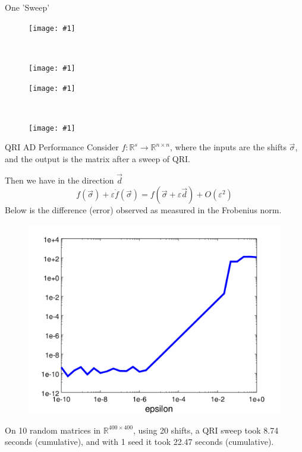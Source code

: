 \documentclass[12pt]{beamer}
\renewcommand{\d}[1]{\dot{#1}}
\newcommand{\e}{\varepsilon}
\newcommand{\pic}[1]{\texttt{[image: \#1]}}
\begin{document}
  \begin{frame}{One 'Sweep'}
    \vspace*{-.8cm}
    \begin{figure}[h!]
      \centering
      \begin{minipage}[t]{.5\linewidth}
        \centering
        \pic{simpSweep1}
      \end{minipage}~
      \begin{minipage}[t]{.5\linewidth}
        \centering
        \pic{simpSweep2}
      \end{minipage}

      \begin{minipage}[b]{.5\linewidth}
        \centering
        \pic{simpSweep3}
      \end{minipage}~
      \begin{minipage}[b]{.5\linewidth}
        \centering
        \pic{simpSweep4}
      \end{minipage}%
    \end{figure}
  \end{frame}

  \begin{frame}{QRI AD Performance}
    Consider $f:\mathbb{R}^s \to \mathbb{R}^{n \times n}$, where the inputs
    are the shifts $\vec{\sigma}$, and the output is the matrix after a sweep of QRI.

    Then we have in the direction $\vec{d}$
    \[
      f(\vec{\sigma}) + \e \d{f}(\vec{\sigma}) = f(\vec{\sigma} + \e \vec{d}) + O(\e^2)
    \]
    Below is the difference (error) observed as measured in the Frobenius norm.
    \vspace*{-1cm}
    \begin{figure}[h!]
      \centering
      \includegraphics[width = .3\textwidth]{qriErr}
    \end{figure}
    On 10 random matrices in $\mathbb{R}^{400 \times 400}$, using 20 shifts, a QRI sweep took 8.74 seconds (cumulative),
    and with 1 seed it took 22.47 seconds (cumulative).
  \end{frame}
\end{document}
